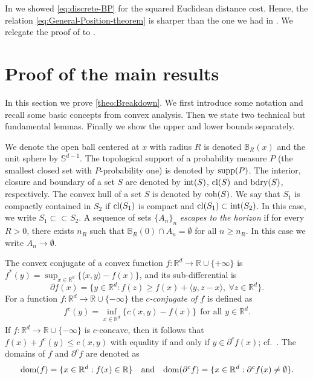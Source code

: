 \documentclass[11pt]{article}
\newcommand{\RR}{\mathbb{R}}
\newcommand{\R}{\RR}
\theoremstyle{plain}
\theoremstyle{definition}\newtheorem{definition}[theorem]{Definition}
\theoremstyle{remark}
\begin{document}
In \cite{Avella-Gonzalez.25} we showed \eqref{eq:discrete-BP} for the squared Euclidean distance cost. 
Hence, the relation \eqref{eq:General-Position-theorem} is sharper than the one we had in \cite{Avella-Gonzalez.25}. We relegate the proof of  to . %


\section{Proof of the main results}
In this section we prove \cref{theo:Breakdown}. We first introduce some notation and recall some basic concepts from convex analysis.  Then we state two technical but fundamental lemmas. Finally we show the upper and lower bounds separately. 

We denote the open ball centered at $x$  with radius
$R$ is denoted  $ \mathbb{B}_{R}(x)$ and the unit sphere by $\mathbb{S}^{d-1}$. The topological support of a probability measure $P$ (the smallest closed set with $P$-probability one) is denoted by $ {\rm supp}(P) $. The interior, closure and boundary of a set $S$ are denoted by ${\rm int}(S)$, ${\rm cl}({S})$ and ${\rm bdry}(S)$, respectively. The convex hull of a set $S$ is denoted by ${\rm coh}(S)$.   We say that $S_1$ is compactly contained in $S_2$ if ${\rm cl}({S}_1)$ is compact and ${\rm cl}({S}_1)\subset {\rm int}(S_2)$. 
%
In this case, we write $S_1 \subset \subset S_2$. A sequence of sets $\{A_n\}_n$ {\it escapes to the horizon} if for every $R>0$, there exists $n_R$ such that $\mathbb{B}_R(0) \cap A_n=\emptyset $ for all $n\geq n_R$. In this case we write  $A_n\to \emptyset$.

The convex conjugate of a convex function $f:\R^d\to \R\cup \{+\infty\}$ is $f^*(y) = \sup_{x \in \R^d} \{ \langle x, y \rangle - f(x) \}  $, 
and its sub-differential is 
$$ \partial f(x) = \{ y \in \mathbb{R}^d: f(z) \geq f(x) + \langle y, z - x \rangle, \ \forall z\in \mathbb{R}^d \} . $$
For a function $f:\R^d\rightarrow \R\cup \{-\infty\}$ the \emph{$c$-conjugate of $f$}  is defined as
\begin{align}\label{CLTgeneq:c_conj}
f^c({y})=\inf_{{x}\in {\mathbb{R}^d}}\{ c({x},{y})-f({x})\} \ \ \text{for all  }{y}\in {\mathbb{R}^d}.
\end{align}
If $f:\R^d\rightarrow \R\cup \{-\infty\}$ is $c$-concave, then it follows that
$ f(x) + f^c(y)\leq c(x,y) $ with equality if and only if $y\in \partial^c f(x)$; cf.~\cite[Proposition~3.3.7]{RachevRueschendorf1998}. The domains of $ f$ and $\partial^c f$ are denoted as 
$$ {\rm dom}(f)= \{ x \in \R^d: f(x) \in \R\}\quad {\rm and}\quad {\rm dom}(\partial^c f)= \{ x \in \R^d: \partial^c f(x) \neq \emptyset \} . $$
\end{document}
